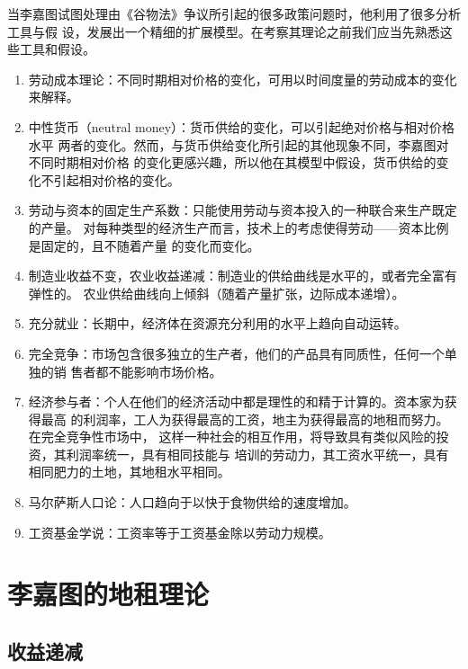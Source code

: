 当李嘉图试图处理由《谷物法》争议所引起的很多政策问题时，他利用了很多分析工具与假
设，发展出一个精细的扩展模型。在考察其理论之前我们应当先熟悉这些工具和假设。

\begin{enumerate}
\item 劳动成本理论：不同时期相对价格的变化，可用以时间度量的劳动成本的变化来解释。

\item 中性货币（neutral money）：货币供给的变化，可以引起绝对价格与相对价格水平
  两者的变化。然而，与货币供给变化所引起的其他现象不同，李嘉图对不同时期相对价格
  的变化更感兴趣，所以他在其模型中假设，货币供给的变化不引起相对价格的变化。

\item 劳动与资本的固定生产系数：只能使用劳动与资本投入的一种联合来生产既定的产量。
  对每种类型的经济生产而言，技术上的考虑使得劳动——资本比例是固定的，且不随着产量
  的变化而变化。


\item 制造业收益不变，农业收益递减：制造业的供给曲线是水平的，或者完全富有弹性的。
  农业供给曲线向上倾斜（随着产量扩张，边际成本递增）。


\item 充分就业：长期中，经济体在资源充分利用的水平上趋向自动运转。


\item 完全竞争：市场包含很多独立的生产者，他们的产品具有同质性，任何一个单独的销
  售者都不能影响市场价格。


\item 经济参与者：个人在他们的经济活动中都是理性的和精于计算的。资本家为获得最高
  的利润率，工人为获得最高的工资，地主为获得最高的地租而努力。在完全竞争性市场中，
  这样一种社会的相互作用，将导致具有类似风险的投资，其利润率统一，具有相同技能与
  培训的劳动力，其工资水平统一，具有相同肥力的土地，其地租水平相同。

\item 马尔萨斯人口论：人口趋向于以快于食物供给的速度增加。

\item  工资基金学说：工资率等于工资基金除以劳动力规模。
\end{enumerate}

\section{李嘉图的地租理论}

\subsection{收益递减}

